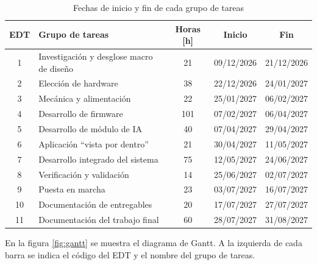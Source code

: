 \documentclass[
11pt, %
]{charter}
\begin{document}
\begin{table}[ht]
\centering
\caption{Fechas de inicio y fin de cada grupo de tareas}
\label{tab:fechas}
\begin{tabularx}{\linewidth}{|c|X|c|c|c|}
\hline
\rowcolor[HTML]{C0C0C0} 
EDT & Grupo de tareas & Horas [h] & Inicio & Fin \\ \hline
1 & Investigación y desglose macro de diseño & 21 & 09/12/2026 & 21/12/2026 \\ \hline
2 & Elección de hardware & 38 & 22/12/2026 & 24/01/2027 \\ \hline
3 & Mecánica y alimentación & 22 & 25/01/2027 & 06/02/2027 \\ \hline
4 & Desarrollo de firmware & 101 & 07/02/2027 & 06/04/2027 \\ \hline
5 & Desarrollo de módulo de IA & 40 & 07/04/2027 & 29/04/2027 \\ \hline
6 & Aplicación ``vista por dentro'' & 21 & 30/04/2027 & 11/05/2027 \\ \hline
7 & Desarrollo integrado del sistema & 75 & 12/05/2027 & 24/06/2027 \\ \hline
8 & Verificación y validación & 14 & 25/06/2027 & 02/07/2027 \\ \hline
9 & Puesta en marcha & 23 & 03/07/2027 & 16/07/2027 \\ \hline
10 & Documentación de entregables & 20 & 17/07/2027 & 27/07/2027 \\ \hline
11 & Documentación del trabajo final & 60 & 28/07/2027 & 31/08/2027 \\ \hline
\end{tabularx}
\end{table}

En la figura \ref{fig:gantt} se muestra el diagrama de Gantt. A la izquierda de cada barra se indica el código del EDT y el nombre del grupo de tareas.
\end{document}
